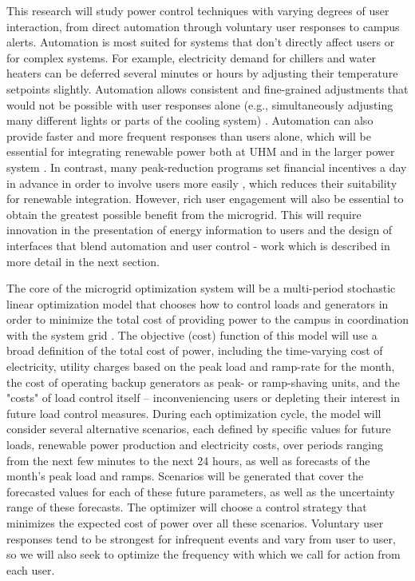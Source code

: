 This research will study power control techniques with varying degrees of user 
interaction, from direct automation through voluntary user responses to campus 
alerts. Automation is most suited for systems that don't directly affect users or
for complex systems. For example, electricity demand for chillers and water
heaters can be deferred several minutes or hours by adjusting their
temperature setpoints slightly. Automation allows consistent and
fine-grained adjustments that would not be possible with user responses
alone (e.g., simultaneously adjusting many different lights or parts of the
cooling system) \cite{Motegi07, Piette06}. Automation can also provide
faster and more frequent responses than users alone, which will be
essential for integrating renewable power both at UHM and in the larger
power system \cite{Stromback11,Callaway09}.  In contrast, many
peak-reduction programs set financial incentives a day in advance in order
to involve users more easily \cite{Boisvert04, Stromback11}, which reduces
their suitability for renewable integration. However, rich user engagement 
will also be essential to obtain the greatest possible benefit from the 
microgrid. This will require innovation in the presentation of energy 
information to users and the design of interfaces that blend automation and 
user control - work which is described in more detail in the next section.
 
The core of the microgrid optimization system will be a multi-period stochastic
linear optimization model \cite{Kall05} that chooses how to control loads and 
generators in order to minimize the total cost of providing power to the campus 
in coordination with the system grid . 
The objective (cost) function of this model will use a broad definition
of the total cost of power, including the time-varying cost of electricity, 
utility charges based on the peak load and ramp-rate for the month,
the cost of operating backup generators as peak- or ramp-shaving units, 
and the "costs" of load control itself -- inconveniencing users or 
depleting their interest in future load control measures.
During each optimization cycle, the model will consider
several alternative scenarios, each defined by specific values for future
loads, renewable power production and electricity costs, over periods ranging from 
the next few minutes to the next 24 hours, as well as forecasts of the month's peak load 
and ramps. Scenarios will be generated that cover the forecasted values 
for each of these future parameters, as well as the uncertainty range of these
forecasts. The optimizer will choose a control strategy that minimizes
the expected cost of power over all these scenarios. Voluntary user responses 
tend to be strongest for infrequent events \cite{Boisvert04}
 \cite{Faruqui10, Stromback11} and vary from user to user, so we 
will also seek to optimize the frequency with which we call for action from each user.

